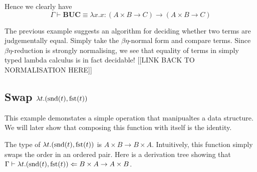\begin{example}
\begin{example}
    Hence we clearly have
    $$
        \Gamma \vdash \mathbf{B} \mathbf{U} \mathbf{C} \equiv \lambda x . x : (A \times B \to C) \to (A \times B \to C)
    $$
\end{example}

\begin{remark}
    The previous example suggests an algorithm for deciding whether two terms are judgementally equal. Simply take the $\beta \eta$-normal form and compare terms. Since $\beta \eta$-reduction is strongly normalising, we see that equality of terms in simply typed lambda calculus is in fact decidable! [[LINK BACK TO NORMALISATION HERE]]
\end{remark}

\subsection{Swap $\lambda t . (\snd(t), \fst(t))$}

This example demonstates a simple operation that manipualtes a data structure. We will later show that composing this function with itself is the identity.

\begin{example}
    The type of $\lambda t . (\snd(t), \fst(t))$ is $A \times B \to B \times A$. Intuitively, this function simply swaps the order in an ordered pair. Here is a derivation tree showing that $\Gamma \vdash \lambda t . (\snd(t), \fst(t)) \Leftarrow B \times A \to A \times B$.

    \begin{prooftree}
        
        

\end{prooftree}
\end{example}
\end{example}
